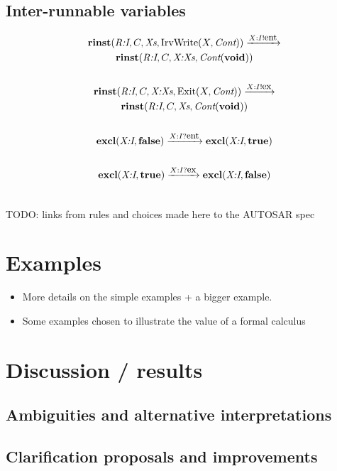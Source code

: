 \documentclass[twocolumn]{article}
\begin{document}
\subsection{Inter-runnable variables}

\begin{gather*}
	\textbf{rinst}(\emph{R:I},C,\text{\it Xs},\text{IrvWrite}(X,\text{\it Cont}))  \xrightarrow{X:I ! \text{\small ent}}  \\
		\textbf{rinst}(\emph{R:I},C,\emph{X:Xs},\text{\it Cont}(\textbf{void})) \\
	\\
	\textbf{rinst}(\emph{R:I},C,\emph{X:Xs},\text{Exit}(X,\text{\it Cont}))  \xrightarrow{X:I ! \text{\small ex}}  \\
		\textbf{rinst}(\emph{R:I},C,\text{\it Xs},\text{\it Cont}(\textbf{void})) \\
	\\
	\textbf{excl}(\emph{X:I},\textbf{false}) \xrightarrow{X:I ? \text{\small ent}} \textbf{excl}(\emph{X:I},\textbf{true}) \\
	\\
	\textbf{excl}(\emph{X:I},\textbf{true}) \xrightarrow{X:I ? \text{\small ex}} \textbf{excl}(\emph{X:I},\textbf{false}) \\
	\\
\end{gather*}


TODO: links from rules and choices made here to the AUTOSAR spec

\section{Examples}
\label{sec:Examples}

\begin{itemize}
\item More details on the simple examples + a bigger example.
\item Some examples chosen to illustrate the value of a formal calculus
\end{itemize}

\section{Discussion / results}
\label{sec:Disc}

\subsection{Ambiguities and alternative interpretations}
\label{sec:DiscAmb}

\subsection{Clarification proposals and improvements}
\label{sec:DiscImp}
\end{document}
